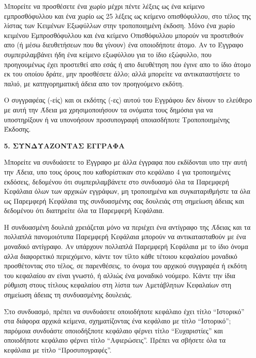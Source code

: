 Μπορείτε να προσθέσετε ένα χωρίο μέχρι πέντε λέξεις ως ένα κείμενο εμπροσθόφυλλου και ένα χωρίο ως 25 λέξεις ως κείμενο οπισθόφυλλου, στο τέλος της λίστας των Κειμένων Εξωφύλλων στην τροποποιημένη έκδοση. Μόνο ένα χωρίο κειμένου Εμπροσθόφυλλου και ένα κείμενο Οπισθόφυλλου μπορούν να προστεθούν απο (ή μέσω διευθετήσεων που θα γίνουν) ένα οποιοδήποτε άτομο. Αν το Έγγραφο συμπεριλαμβάνει ήδη ένα κείμενο εξωφύλλου για το ίδιο εξώφυλλο, που προηγουμένως έχει προστεθεί απο εσάς ή απο διευθέτηση που έγινε απο το ίδιο άτομο εκ του οποίου δράτε, μην προσθέσετε άλλο; αλλά μπορείτε να αντικαταστήσετε το παλιό, με κατηγορηματική άδεια απο τον προηγούμενο εκδότη.

Ο συγγραφέας (-είς) και οι εκδότης (-ες) αυτού του Εγγράφου δεν δίνουν το ελεύθερο με αυτή την Άδεια μα χρησιμοποιήσουν τα ονόματα τους δημόσια για να υποστηρίξουν ή να υπονοήσουν προσυπογραφή οποιασδήποτε Τροποποιημένης Έκδοσης.


\begin{center}
{\Large\bf 5. ΣΥΝΔΥΑΖΟΝΤΑΣ ΕΓΓΡΑΦΑ\par}
\end{center}


Μπορείτε να συνδυάσετε το Έγγραφο με άλλα έγγραφα που εκδίδονται υπο την αυτή την Άδεια, υπο τους όρους που καθορίστικαν στο κεφάλαιο 4 για τροποιημένες εκδόσεις, δεδομένου ότι συμπεριλαμβάνετε στο συνδυασμό όλα τα Παρεμφερή Κεφάλαια όλων των αρχικών εγγράφων, μη τροποιημένα και συγκαταριθμήστε τα όλα ως Παρεμφερή Κεφάλαια της συνδυασμένης σας δουλειάς στη σημείωση άδειας και δεδομένου ότι διατηρείτε όλα τα Παρεμφερή Κεφάλαια.

Η συνδυασμένη δουλειά χρειάζεται μόνο να περιέχει ένα αντίγραφο της Άδειας και τα πολλαπλά πανομοιότυπα Παρεμφερή Κεφάλαια μπορούν να αντικατασταθούν με ένα μοναδικό αντίγραφο. Αν υπάρχουν πολλαπλά Παρεμφερή Κεφάλαια με το ίδιο όνομα αλλα διαφορετικό περιεχόμενο, κάντε τον τίλτο κάθε τέτοιου κεφαλαίου μοναδικό προσθέτοντας στο τέλος, σε παρενθέσεις, το όνομα του αρχικού συγγραφέα ή εκδότη του κεφαλαίου αν είναι γνωστό, ή αλλιώς ένα μοναδικό νούμερο. Κάντε την ίδια ρύθμιση στους τίτλους κεφαλαίου στη λίστα των Αμετάβλητων Κεφαλαίων στη σημείωση άδειας τη συνδυασμένης δουλειάς. 

Στο συνδυασμό, πρέπει να συνδυάσετε οποιοδήποτε κεφάλαιο έχει τίτλο “Ιστορικό” στα διάφορα αρχικά κείμενα, σχηματίζοντας ένα κεφάλαιο με τίτλο “Ιστορικό”; παρόμοια συνδυάστε οποιοδήξποτε κεφάλαιο φέρνει τίτλο “Ευχαριστίες” και οποιοδήποτε κεφάλαιο φέρνει τίτλο “Αφιερώσεις”. Πρέπει να σβήσετε όλα τα κεφάλαια με τίτλο “Προσυπογραφές”. 

